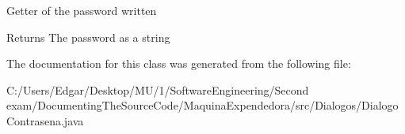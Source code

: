 Getter of the password written \begin{DoxyReturn}{Returns}
The password as a string 
\end{DoxyReturn}


The documentation for this class was generated from the following file\+:\begin{DoxyCompactItemize}
\item 
C\+:/\+Users/\+Edgar/\+Desktop/\+M\+U/1/\+Software\+Engineering/\+Second exam/\+Documenting\+The\+Source\+Code/\+Maquina\+Expendedora/src/\+Dialogos/Dialogo\+Contrasena.\+java\end{DoxyCompactItemize}
